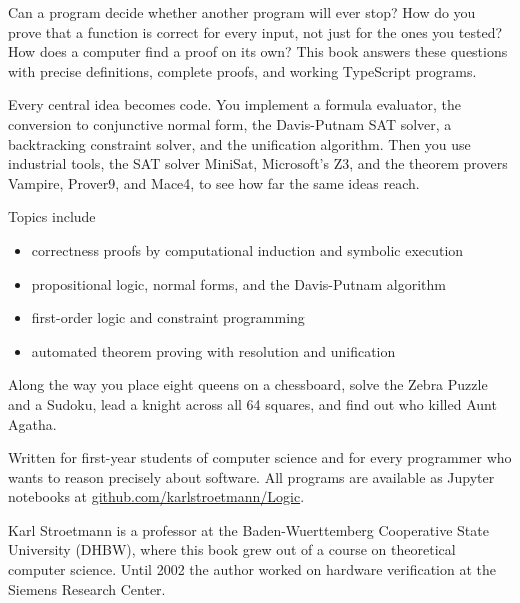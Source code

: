 Can a program decide whether another program will ever stop? How do you prove that a function is correct for every input, not just for the ones you tested? How does a computer find a proof on its own? This book answers these questions with precise definitions, complete proofs, and working TypeScript programs.
\par\medskip

Every central idea becomes code. You implement a formula evaluator, the conversion to conjunctive normal form, the Davis-Putnam SAT solver, a backtracking constraint solver, and the unification algorithm. Then you use industrial tools, the SAT solver MiniSat, Microsoft's Z3, and the theorem provers Vampire, Prover9, and Mace4, to see how far the same ideas reach.
\par\medskip

Topics include
\begin{itemize}
\item correctness proofs by computational induction and symbolic execution
\item propositional logic, normal forms, and the Davis-Putnam algorithm
\item first-order logic and constraint programming
\item automated theorem proving with resolution and unification
\end{itemize}
\par\medskip

Along the way you place eight queens on a chessboard, solve the Zebra Puzzle and a Sudoku, lead a knight across all 64 squares, and find out who killed Aunt Agatha.
\par\medskip

Written for first-year students of computer science and for every programmer who wants to reason precisely about software. All programs are available as Jupyter notebooks at \url{github.com/karlstroetmann/Logic}.
\par\medskip

Karl Stroetmann is a professor at the Baden-Wuerttemberg Cooperative State University (DHBW), where this book grew out of a course on theoretical computer science. Until 2002 the author worked on hardware verification at the Siemens Research Center.
\par\medskip


